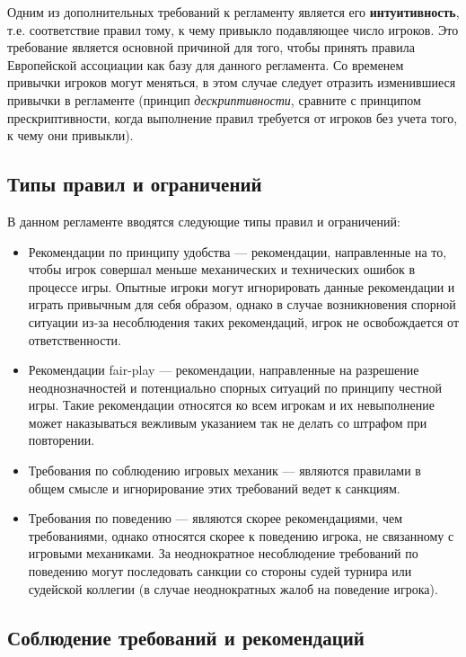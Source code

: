 Одним из дополнительных требований к регламенту является его \textbf{интуитивность}, т.е. соответствие правил тому, к чему привыкло подавляющее число игроков. Это требование является основной причиной для того, чтобы принять правила Европейской ассоциации как базу для данного регламента. Со временем привычки игроков могут меняться, в этом случае следует отразить изменившиеся привычки в регламенте (принцип \textit{дескриптивности}, сравните с принципом прескриптивности, когда выполнение правил требуется от игроков без учета того, к чему они привыкли).

\subsection{Типы правил и ограничений}

В данном регламенте вводятся следующие типы правил и ограничений:
\begin{itemize}
	\item Рекомендации по принципу удобства --- рекомендации, направленные на то, чтобы игрок совершал меньше механических и технических ошибок в процессе игры. Опытные игроки могут игнорировать данные рекомендации и играть привычным для себя образом, однако в случае возникновения спорной ситуации из-за несоблюдения таких рекомендаций, игрок не освобождается от ответственности.
	\item Рекомендации fair-play --- рекомендации, направленные на разрешение неоднозначностей и потенциально спорных ситуаций по принципу честной игры. Такие рекомендации относятся ко всем игрокам и их невыполнение может наказываться вежливым указанием так не делать со штрафом при повторении.
	\item Требования по соблюдению игровых механик --- являются правилами в общем смысле и игнорирование этих требований ведет к санкциям.
	\item Требования по поведению --- являются скорее рекомендациями, чем требованиями, однако относятся скорее к поведению игрока, не связанному с игровыми механиками. За неоднократное несоблюдение требований по поведению могут последовать санкции со стороны судей турнира или судейской коллегии (в случае неоднократных жалоб на поведение игрока).
\end{itemize}

\subsection{Соблюдение требований и рекомендаций}

